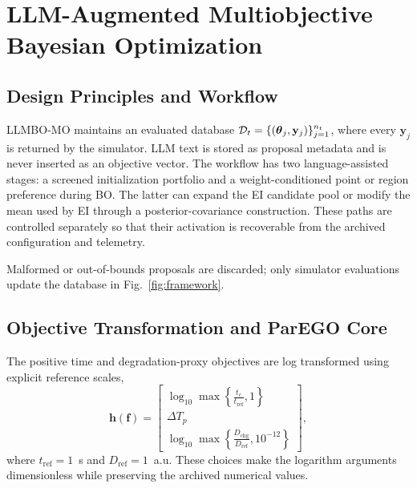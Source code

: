 \section{LLM-Augmented Multiobjective Bayesian Optimization}
\label{sec:method}

\subsection{Design Principles and Workflow}

LLMBO-MO maintains an evaluated database
$\mathcal{D}_t=\{(\boldsymbol{\theta}_j,\mathbf y_j)\}_{j=1}^{n_t}$, where every
$\mathbf y_j$ is returned by the simulator. LLM text is stored as proposal
metadata and is never inserted as an objective vector. The workflow has two
language-assisted stages: a screened initialization portfolio and a
weight-conditioned point or region preference during BO. The latter can expand
the EI candidate pool or modify the mean used by EI through a
posterior-covariance construction. These paths are controlled separately so
that their activation is recoverable from the archived configuration and
telemetry.



Malformed or out-of-bounds proposals are discarded; only simulator
evaluations update the database in Fig.~\ref{fig:framework}.

\subsection{Objective Transformation and ParEGO Core}
\label{sec:scalarization}

The positive time and degradation-proxy objectives are log transformed using
explicit reference scales,
\begin{equation}
\mathbf h(\mathbf f)=
\begin{bmatrix}
\log_{10}\!\max\!\left\{\frac{t_c}{t_{\mathrm{ref}}},1\right\}
\\[-1pt]
\Delta T_p
\\[-1pt]
\log_{10}\!\max\!\left\{\frac{D_{\mathrm{chg}}}{D_{\mathrm{ref}}},
10^{-12}\right\}
\end{bmatrix},
\label{eq:log_transform}
\end{equation}
where $t_{\mathrm{ref}}=1$~s and $D_{\mathrm{ref}}=1$~a.u. These choices make
the logarithm arguments dimensionless while preserving the archived numerical
values.

